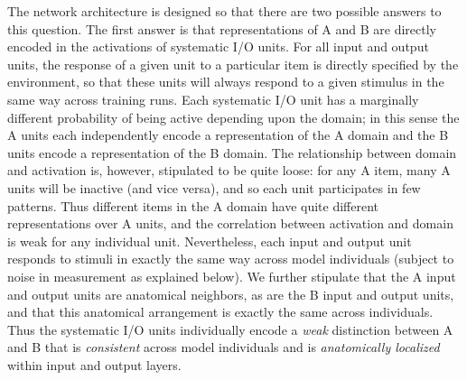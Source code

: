The network architecture is designed so that there are two possible answers to this question. The first answer is that representations of A and B are directly encoded in the activations of systematic I/O units. For all input and output units, the response of a given unit to a particular item is directly specified by the environment, so that these units will always respond to a given stimulus in the same way across training runs. Each systematic I/O unit has a marginally different probability of being active depending upon the domain; in this sense the A units each independently encode a representation of the A domain and the B units encode a representation of the B domain. The relationship between domain and activation is, however, stipulated to be quite loose: for any A item, many A units will be inactive (and vice versa), and so each unit participates in few patterns. Thus different items in the A domain have quite different representations over A units, and the correlation between activation and domain is weak for any individual unit. Nevertheless, each input and output unit responds to stimuli in exactly the same way across model individuals (subject to noise in measurement as explained below). We further stipulate that the A input and output units are anatomical neighbors, as are the B input and output units, and that this anatomical arrangement is exactly the same across individuals. Thus the systematic I/O units individually encode a {\em weak} distinction between A and B that is {\em consistent} across model individuals and is {\em anatomically localized} within input and output layers. 

